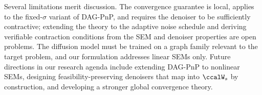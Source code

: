 \documentclass[conference]{IEEEtran}
\begin{document}
	Several limitations merit discussion. The convergence guarantee is local, applies to the fixed-$\sigma$ variant of DAG-PnP, and requires the denoiser to be sufficiently contractive; extending the theory to the adaptive noise schedule and deriving verifiable contraction conditions from the SEM and denoiser properties are open problems. The diffusion model must be trained on a graph family relevant to the target problem, and our formulation addresses linear SEMs only. Future directions in our research agenda include extending DAG-PnP to nonlinear SEMs, designing feasibility-preserving denoisers that map into $\ccalW_s$ by construction, and developing a stronger global convergence theory.
	
	
	

    \appendices

\end{document}
